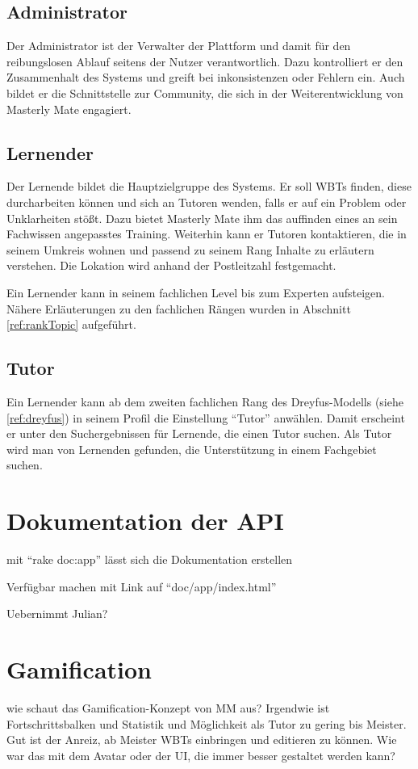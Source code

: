 \subsection{Administrator}
Der Administrator ist der Verwalter der Plattform und damit für den
reibungslosen Ablauf seitens der Nutzer verantwortlich. Dazu kontrolliert er den
Zusammenhalt des Systems und greift bei inkonsistenzen oder Fehlern ein. Auch
bildet er die Schnittstelle zur Community, die sich in der Weiterentwicklung von
Masterly Mate engagiert.

\subsection{Lernender}
Der Lernende bildet die Hauptzielgruppe des Systems. Er soll WBTs finden, diese
durcharbeiten können und sich an Tutoren wenden, falls er auf ein Problem oder
Unklarheiten stößt. Dazu bietet Masterly Mate ihm das auffinden eines an sein
Fachwissen angepasstes Training. Weiterhin kann er Tutoren kontaktieren, die in
seinem Umkreis wohnen und passend zu seinem Rang Inhalte zu erläutern verstehen.
Die Lokation wird anhand der Postleitzahl festgemacht.

Ein Lernender kann in seinem fachlichen Level bis zum Experten aufsteigen.
Nähere Erläuterungen zu den fachlichen Rängen wurden in Abschnitt
\ref{ref:rankTopic} aufgeführt.

\subsection{Tutor}
Ein Lernender kann ab dem zweiten fachlichen Rang des Dreyfus-Modells (siehe
\ref{ref:dreyfus}) in seinem Profil die Einstellung "`Tutor"' anwählen. Damit
erscheint er unter den Suchergebnissen für Lernende, die einen Tutor suchen. Als
Tutor wird man von Lernenden gefunden, die Unterstützung in einem Fachgebiet
suchen.

\section{Dokumentation der API}
\begin {k}
mit "`rake doc:app"' lässt sich die Dokumentation erstellen

Verfügbar machen mit Link auf "`doc/app/index.html"'

Uebernimmt Julian?
\end{k}

\section{Gamification}\label{ref:gamificationConcept}
\begin{k}
wie schaut das Gamification-Konzept von MM aus? Irgendwie ist Fortschrittsbalken
und Statistik und Möglichkeit als Tutor zu gering bis Meister. Gut ist der
Anreiz, ab Meister WBTs einbringen und editieren zu können. Wie war das mit dem
Avatar oder der UI, die immer besser gestaltet werden kann?
\end{k}

